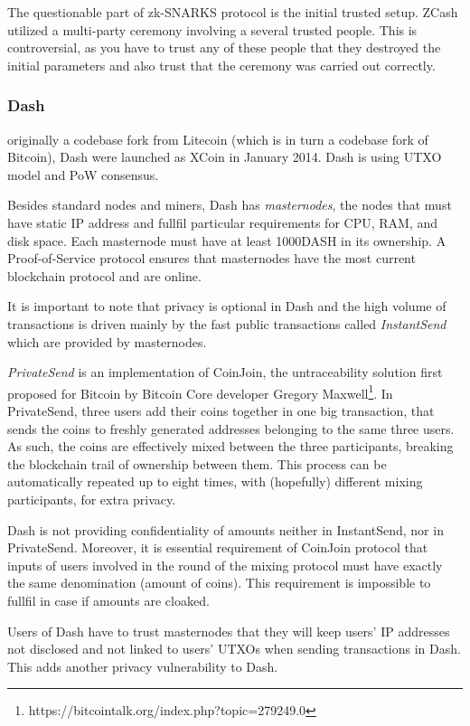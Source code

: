 \documentclass[a4paper, 10pt, conference]{ieeeconf}
\begin{document}
The questionable part of zk-SNARKS protocol is the initial trusted setup. ZCash utilized a multi-party ceremony involving a several trusted people. This is controversial, as you have to trust any of these people that they destroyed the initial parameters and also trust that the ceremony was carried out correctly. 

\subsubsection{Dash} originally a codebase fork from Litecoin (which is in turn a codebase fork of Bitcoin), Dash were launched as XCoin in January 2014. Dash is using UTXO model and PoW consensus. 

Besides standard nodes and miners, Dash has \textit{masternodes}, the nodes that must have static IP address and fullfil particular requirements for CPU, RAM, and disk space. Each masternode must have at least 1000DASH in its ownership. A Proof-of-Service protocol ensures that masternodes have the most current blockchain protocol and are online. 

It is important to note that privacy is optional in Dash and the high volume of transactions is driven mainly by the fast public transactions called \textit{InstantSend} which are provided by masternodes.

\textit{PrivateSend} is an implementation of CoinJoin, the untraceability solution first proposed for Bitcoin by Bitcoin Core developer Gregory Maxwell\footnote{https://bitcointalk.org/index.php?topic=279249.0}. In PrivateSend, three users add their coins together in one big transaction, that sends the coins to freshly generated addresses belonging to the same three users. As such, the coins are effectively mixed between the three participants, breaking the blockchain trail of ownership between them. This process can be automatically repeated up to eight times, with (hopefully) different mixing participants, for extra privacy.

Dash is not providing confidentiality of amounts neither in InstantSend, nor in PrivateSend. Moreover, it is essential requirement of CoinJoin protocol that inputs of users involved in the round of the mixing protocol must have exactly the same denomination (amount of coins). This requirement is impossible to fullfil in case if amounts are cloaked. 

Users of Dash have to trust masternodes that they will keep users' IP addresses not disclosed and not linked to users' UTXOs when sending transactions in Dash. This adds another privacy vulnerability to Dash.
\end{document}
